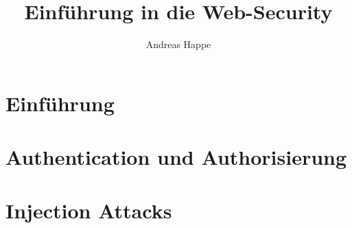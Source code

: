 \documentclass[11pt]{memoir}
\title{Einführung in die Web-Security}
\author{Andreas Happe}
\begin{document}

\tableofcontents %

\cleardoublepage %



\mainmatter

\part{Einführung}













\part{Authentication und Authorisierung}









\part{Injection Attacks}






\end{document}
